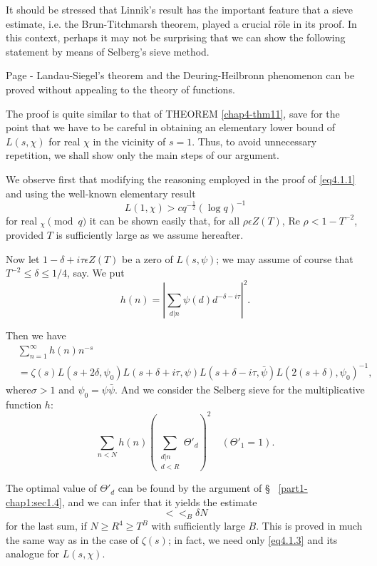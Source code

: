 It should be stressed that Linnik's result has the important feature
that a sieve estimate, i.e. the Brun-Titchmarsh theorem, played a
crucial r$\hat{o}$le in its proof. In this context, perhaps it may not
be surprising that we can show the following statement by means of
Selberg's sieve method. 

\begin{theorem}\label{chap4-thm12}%
Page - Landau-Siegel's theorem and the Deuring-Heil\-bronn
phenomenon\pageoriginale 
can be proved without appealing to the theory of functions. 
\end{theorem}

The proof is quite similar to that of THEOREM \ref{chap4-thm11}, save
for the point 
that we have to be careful in obtaining an elementary lower bound of
$L(s, \chi)$ for real $\chi$ in the vicinity of $s = 1$. Thus, to
avoid unnecessary repetition, we shall show only the main steps of our
argument. 

We observe first that modifying the reasoning employed in the proof of
\eqref{eq4.1.1} and using the well-known elementary result 
\begin{equation*}
  L(1, \chi ) > c q^{-\frac{1}{2}} (\log q)^{-1}
  \tag{4.2.4}\label{eq4.2.4} 
\end{equation*}
for real $_\chi \pmod{q}$ it can be shown easily that, for all $\rho
\epsilon  Z(T)$, Re $\rho < 1 - T^{-2}$, provided $T$ is
sufficiently large as we assume hereafter. 

Now let $1 -  \delta + i \tau \epsilon  Z(T)$ be a zero of $L (s,
\psi)$; we may assume of course that $T^{-2} \le \delta \le 1/4$,
say. We put 
$$
h(n) = | \sum_{d | n} \psi (d) d^{- \delta - i \tau } |^2.
$$

Then we have
\begin{align*}
  &\sum_{n = 1}^{\infty} h (n) n^{-s} \\
  &= \zeta (s) L(s + 2 \delta,  \psi_0 ) L (s + \delta + i \tau,  \psi
  ) L (s + \delta - i \tau, \bar{\psi}) L (2(s + \delta ), \psi_0
  )^{-1}, 
\end{align*}
where\pageoriginale $\sigma > 1$ and $\psi_0 = \psi \bar{\psi}$. And
we consider the 
Selberg sieve for the multiplicative function $h$: 
$$
\sum_{n < N} h(n) \left( \sum_{\substack{d | n \\ d < R}} \Theta'_d\right)^2
\quad (\Theta'_1 = 1). 
$$

The optimal value of $\Theta'_d$ can be found by the argument of \S~
\ref{part1-chap1:sec1.4}, and we can infer that it yields the estimate 
\begin{equation*}
  <<_B \delta N \tag{4.2.5}\label{eq4.2.5}
\end{equation*}
for the last sum, if $N \geq R^4 \geq T^B$ with sufficiently large
$B$. This is proved in much the same way as in the case of $ \zeta
(s)$; in fact, we need only \eqref{eq4.1.3} and its analogue for $L(s,
\chi)$. 

